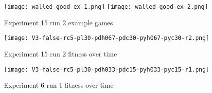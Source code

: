 \begin{figure}
  \texttt{[image: walled-good-ex-1.png]}
  \textrm{   }
  \texttt{[image: walled-good-ex-2.png]}
  \caption{Experiment 15 run 2  example games}
  \label{fig:walled-good-game-ex}
\end{figure}

\begin{figure}
   \centering
  \texttt{[image: V3-false-rc5-pl30-pdh067-pdc30-pyh067-pyc30-r2.png]}  
  \caption{Experiment 15 run 2 fitness over time}
  \label{fig:walled-good-1}
\end{figure}


\begin{figure}
   \centering
  \texttt{[image: V3-false-rc5-pl30-pdh033-pdc15-pyh033-pyc15-r1.png]}  
  \caption{Experiment 6 run 1 fitness over time}
  \label{fig:walled-good-2}
\end{figure}



